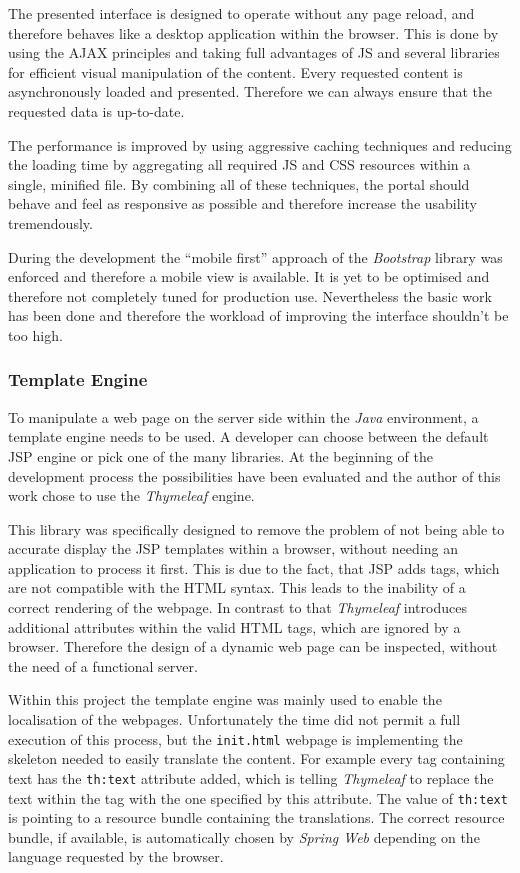 The presented interface is designed to operate without any page reload, and therefore behaves like a desktop application within the browser. This is done by using the \gls{AJAX} principles and taking full advantages of \gls{JS} and several libraries for efficient visual manipulation of the content. Every requested content is asynchronously loaded and presented. Therefore we can always ensure that the requested data is up-to-date.

The performance is improved by using aggressive caching techniques and reducing the loading time by aggregating all required \gls{JS} and \gls{CSS} resources within a single, minified file. By combining all of these techniques, the portal should behave and feel as responsive as possible and therefore increase the usability tremendously.

During the development the \enquote{mobile first} approach of the \emph{Bootstrap} library was enforced and therefore a mobile view is available. It is yet to be optimised and therefore not completely tuned for production use. Nevertheless the basic work has been done and therefore the workload of improving the interface shouldn't be too high.

\subsubsection{Template Engine}

To manipulate a web page on the server side within the \emph{Java} environment, a template engine needs to be used. A developer can choose between the default \gls{JSP} engine or pick one of the many libraries. At the beginning of the development process the possibilities have been evaluated and the author of this work chose to use the \emph{Thymeleaf} engine.

This library was specifically designed to remove the problem of not being able to accurate display the \gls{JSP} templates within a browser, without needing an application to process it first. This is due to the fact, that \gls{JSP} adds tags, which are not compatible with the \gls{HTML} syntax. This leads to the inability of a correct rendering of the webpage. In contrast to that \emph{Thymeleaf} introduces additional attributes within the valid \gls{HTML} tags, which are ignored by a browser. Therefore the design of a dynamic web page can be inspected, without the need of a functional server.

Within this project the template engine was mainly used to enable the localisation of the webpages. Unfortunately the time did not permit a full execution of this process, but the \texttt{init.html} webpage is implementing the skeleton needed to easily translate the content. For example every tag containing text has the \texttt{th:text} attribute added, which is telling \emph{Thymeleaf} to replace the text within the tag with the one specified by this attribute. The value of \texttt{th:text} is pointing to a resource bundle containing the translations. The correct resource bundle, if available, is automatically chosen by \emph{Spring Web} depending on the language requested by the browser.

